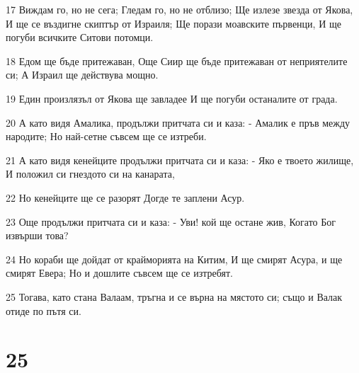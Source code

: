 \par 17 Виждам го, но не сега; Гледам го, но не отблизо; Ще излезе звезда от Якова, И ще се въздигне скиптър от Израиля; Ще порази моавските първенци, И ще погуби всичките Ситови потомци.
\par 18 Едом ще бъде притежаван, Още Сиир ще бъде притежаван от неприятелите си; А Израил ще действува мощно.
\par 19 Един произлязъл от Якова ще завладее И ще погуби останалите от града.
\par 20 А като видя Амалика, продължи притчата си и каза: - Амалик е пръв между народите; Но най-сетне съвсем ще се изтреби.
\par 21 А като видя кенейците продължи притчата си и каза: - Яко е твоето жилище, И положил си гнездото си на канарата,
\par 22 Но кенейците ще се разорят Догде те заплени Асур.
\par 23 Още продължи притчата си и каза: - Уви! кой ще остане жив, Когато Бог извърши това?
\par 24 Но кораби ще дойдат от крайморията на Китим, И ще смирят Асура, и ще смирят Евера; Но и дошлите съвсем ще се изтребят.
\par 25 Тогава, като стана Валаам, тръгна и се върна на мястото си; също и Валак отиде по пътя си.

\chapter{25}

